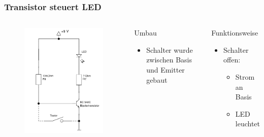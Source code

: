 \begin{frame}
    \frametitle{Transistor steuert LED}
    \begin{columns}[c]
        \begin{figure}[H]
        \begin{center}
                \includegraphics[scale=0.35]{./img/schaltungen/transistorLED_2.png}
        \end{center}
        \end{figure}
    \begin{block}{Umbau}
        \begin{itemize}
            \item Schalter wurde zwischen Basis und Emitter gebaut
        \end{itemize}    
    \end{block}
    \begin{block}{Funktionsweise}
        \begin{itemize}
            \item Schalter offen:
            \begin{itemize}
                \item Strom an Basis
                \item LED leuchtet

\end{itemize}
\end{itemize}
\end{block}
\end{columns}
\end{frame}
